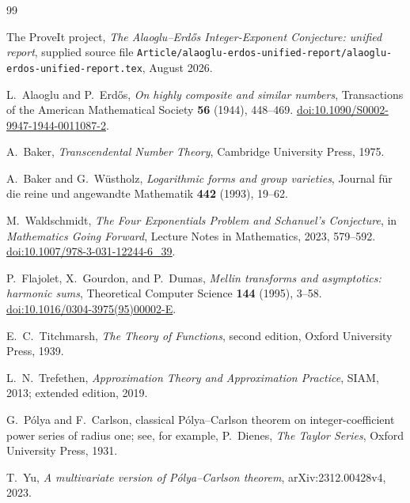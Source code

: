 \documentclass[11pt,oneside]{article}
\theoremstyle{definition}
\theoremstyle{remark}
\begin{document}
\begin{thebibliography}{99}

The ProveIt project,
\newblock \emph{The Alaoglu--Erd\H{o}s Integer-Exponent Conjecture: unified report},
\newblock supplied source file
\texttt{Article/alaoglu-erdos-unified-report/alaoglu-erdos-unified-report.tex},
August 2026.

L.~Alaoglu and P.~Erd\H{o}s,
\newblock \emph{On highly composite and similar numbers},
\newblock Transactions of the American Mathematical Society \textbf{56} (1944), 448--469.
\newblock \href{https://doi.org/10.1090/S0002-9947-1944-0011087-2}{doi:10.1090/S0002-9947-1944-0011087-2}.

A.~Baker,
\newblock \emph{Transcendental Number Theory},
\newblock Cambridge University Press, 1975.

A.~Baker and G.~W\"ustholz,
\newblock \emph{Logarithmic forms and group varieties},
\newblock Journal f\"ur die reine und angewandte Mathematik \textbf{442} (1993), 19--62.

M.~Waldschmidt,
\newblock \emph{The Four Exponentials Problem and Schanuel's Conjecture},
\newblock in \emph{Mathematics Going Forward}, Lecture Notes in Mathematics, 2023, 579--592.
\newblock \href{https://doi.org/10.1007/978-3-031-12244-6_39}{doi:10.1007/978-3-031-12244-6\_39}.

P.~Flajolet, X.~Gourdon, and P.~Dumas,
\newblock \emph{Mellin transforms and asymptotics: harmonic sums},
\newblock Theoretical Computer Science \textbf{144} (1995), 3--58.
\newblock \href{https://doi.org/10.1016/0304-3975(95)00002-E}{doi:10.1016/0304-3975(95)00002-E}.

E.~C.~Titchmarsh,
\newblock \emph{The Theory of Functions}, second edition,
\newblock Oxford University Press, 1939.

L.~N.~Trefethen,
\newblock \emph{Approximation Theory and Approximation Practice},
\newblock SIAM, 2013; extended edition, 2019.

G.~P\'olya and F.~Carlson,
\newblock classical P\'olya--Carlson theorem on integer-coefficient power series of radius one;
\newblock see, for example, P.~Dienes, \emph{The Taylor Series}, Oxford University Press, 1931.

T.~Yu,
\newblock \emph{A multivariate version of P\'olya--Carlson theorem},
\newblock arXiv:2312.00428v4, 2023.


\end{thebibliography}
\end{document}
